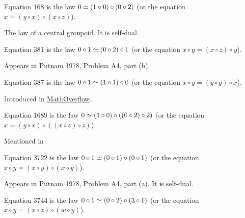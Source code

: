 \begin{definition}[Equation 168]\label{eq168}\leanok{}  Equation 168 is the law $0  \simeq  (1 \circ 0) \circ (0 \circ 2)$ (or the equation $x = (y \circ x) \circ (x \circ z)$).
\end{definition}

The law of a central groupoid. It is self-dual.

\begin{definition}[Equation 381]\label{eq381}\leanok{}  Equation 381 is the law $0 \circ 1  \simeq  (0 \circ 2) \circ 1$ (or the equation $x \circ y = (x \circ z) \circ y$).
\end{definition}

Appears in Putnam 1978, Problem A4, part (b).

\begin{definition}[Equation 387]\label{eq387}\leanok{}  Equation 387 is the law $0 \circ 1  \simeq  (1 \circ 1) \circ 0$ (or the equation $x \circ y = (y \circ y) \circ x$).
\end{definition}

Introduced in \href{https://mathoverflow.net/a/450905/766}{MathOverflow}.

\begin{definition}[Equation 1689]\label{eq1689}\leanok{}  Equation 1689 is the law $0 \simeq  (1 \circ 0) \circ ((0 \circ 2) \circ 2)$ (or the equation $x = (y \circ x) \circ ((x \circ z) \circ z)$).
\end{definition}

Mentioned in \cite{Kisielewicz2}.

\begin{definition}[Equation 3722]\label{eq3722}\leanok{}  Equation 3722 is the law $0 \circ 1  \simeq  (0 \circ 1) \circ (0 \circ 1)$ (or the equation $x \circ y = (x \circ y) \circ (x \circ y)$).
\end{definition}

Appears in Putnam 1978, Problem A4, part (a).  It is self-dual.

\begin{definition}[Equation 3744]\label{eq3744}\leanok{}  Equation 3744 is the law $0 \circ 1  \simeq  (0 \circ 2) \circ (3 \circ 1)$ (or the equation $x \circ y = (x \circ z) \circ (w \circ y)$).
\end{definition}

